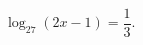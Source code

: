 \begin{ex}[type=equation]
	\begin{condition}
		$\log_{27} (2x - 1) = \dfrac{1}{3} .$
	\end{condition}
\end{ex}